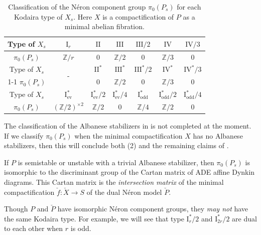\documentclass[reqno, letterpaper]{amsart}
\numberwithin{equation}{subsection}
\let\to\longrightarrow
\newcommand{\ZZ}{\mathbb{Z}}
\begin{document}
		\begin{table}[t]
			\begin{tabular}{|c||c|c|c|c|c|c|} \hline
				Type of $X_s$ & $\mathrm I_r$ & $\mathrm{II}$ & \multicolumn{1}{c}{$\mathrm{III}$} & $\mathrm{III}/2$ & \multicolumn{1}{c}{$\mathrm{IV}$} & $\mathrm{IV}/3$ \\ \hline
				$\pi_0(P_s)$ & $\ZZ/r$ & $0$ & \multicolumn{1}{c}{$\ZZ/2$} & $0$ & \multicolumn{1}{c}{$\ZZ/3$} & $0$ \\ \hline\hline
				Type of $X_s$ & \multirow{2}{*}{-} & $\mathrm{II}^*$ & \multicolumn{1}{c}{$\mathrm{III}^*$} & $\mathrm{III}^*/2$ & \multicolumn{1}{c}{$\mathrm{IV}^*$} & $\mathrm{IV}^*/3$ \\ \cline{1-1} \cline{3-7}
				$\pi_0(P_s)$ & & $0$ & \multicolumn{1}{c}{$\ZZ/2$} & $0$ & \multicolumn{1}{c}{$\ZZ/3$} & $0$ \\ \hline\hline
				Type of $X_s$ & \multicolumn{1}{c}{$\mathrm I_{\operatorname{ev}}^*$} & \multicolumn{1}{c}{$\mathrm I_{\operatorname{ev}}^*/2$} & $\mathrm I_{\operatorname{ev}}^*/4$ & \multicolumn{1}{c}{$\mathrm I_{\operatorname{odd}}^*$} & \multicolumn{1}{c}{$\mathrm I_{\operatorname{odd}}^*/2$} & $\mathrm I_{\operatorname{odd}}^*/4$ \\ \hline
				$\pi_0(P_s)$ & \multicolumn{1}{c}{$(\ZZ/2)^{\times 2}$} & \multicolumn{1}{c}{$\ZZ/2$} & $0$ & \multicolumn{1}{c}{$\ZZ/4$} & \multicolumn{1}{c}{$\ZZ/2$} & $0$ \\ \hline
			\end{tabular}
			
			\medskip
			
			\caption{Classification of the N\'eron component group $\pi_0(P_s)$ for each Kodaira type of $X_s$. Here $X$ is a compactification of $P$ as a minimal abelian fibration.}
			\label{table:classification of Neron component group}
		\end{table}
		
		\begin{remark} \label{rmk:classification of component group}
			The classification of the Albanese stabilizers in  is not completed at the moment. If we classify $\pi_0(P_s)$ when the minimal compactification $X$ has no Albanese stabilizers, then this will conclude both (2) and the remaining claims of .
			
			If $P$ is semistable or unstable with a trivial Albanese stabilizer, then $\pi_0(P_s)$ is isomorphic to the discriminant group of the Cartan matrix of ADE affine Dynkin diagrams. This Cartan matrix is the \emph{intersection matrix} of the minimal compactification $\check f: \check X \to S$ of the dual N\'eron model $\check P$.
			
			Though $P$ and $\check P$ have isomorphic N\'eron component groups, they \emph{may not} have the same Kodaira type. For example, we will see that type $\mathrm I_r^*/2$ and $\mathrm I_{2r}^*/2$ are dual to each other when $r$ is odd.
		\end{remark}
		
\end{document}
